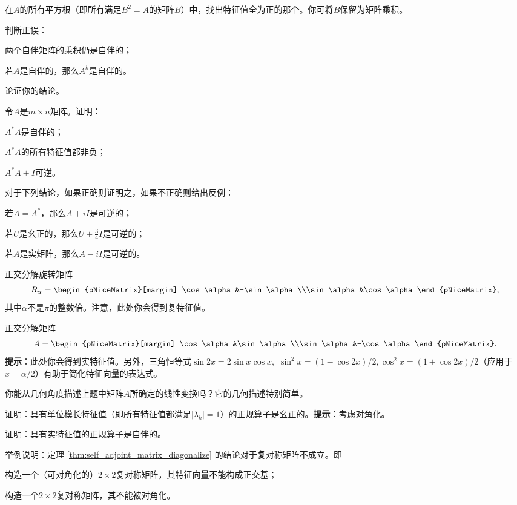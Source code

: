\begin{problemset}
    在$A$的所有平方根（即所有满足$B^2=A$的矩阵$B$）中，找出特征值全为正的那个。你可将$B$保留为矩阵乘积。
    \item 判断正误：
    \begin{probenumerate}
        \item 两个自伴矩阵的乘积仍是自伴的；
        \item 若$A$是自伴的，那么$A^k$是自伴的。
    \end{probenumerate}
    论证你的结论。
    \item 令$A$是$m\times n$矩阵。证明：
    \begin{probenumerate}
        \item $A^*A$是自伴的；
        \item $A^*A$的所有特征值都非负；
        \item $A^*A+I$可逆。
    \end{probenumerate}
    \item 对于下列结论，如果正确则证明之，如果不正确则给出反例：
    \begin{probenumerate}
        \item 若$A=A^*$，那么$A+iI$是可逆的；
        \item 若$U$是幺正的，那么$U+\frac34I$是可逆的；
        \item 若$A$是实矩阵，那么$A-iI$是可逆的。
    \end{probenumerate}
    \item 正交分解旋转矩阵\[R_\alpha=\begin{pNiceMatrix}[margin]
        \cos\alpha&-\sin\alpha\\\sin\alpha&\cos\alpha
    \end{pNiceMatrix},\]其中$\alpha$不是$\pi$的整数倍。注意，此处你会得到复特征值。
    \item 正交分解矩阵\[A=\begin{pNiceMatrix}[margin]
        \cos\alpha&\sin\alpha\\\sin\alpha&-\cos\alpha
    \end{pNiceMatrix}.\]
    {\bf 提示}：此处你会得到实特征值。另外，三角恒等式$\sin2x=2\sin x\cos x,$ $\sin^2x=(1-\cos2x)/2,\cos^2x=(1+\cos2x)/2$（应用于$x=\alpha/2$）有助于简化特征向量的表达式。
    \item 你能从几何角度描述上题中矩阵$A$所确定的线性变换吗？它的几何描述特别简单。
    \item 证明：具有单位模长特征值（即所有特征值都满足$|\lambda_k|=1$）的正规算子是幺正的。{\bf 提示}：考虑对角化。
    \item 证明：具有实特征值的正规算子是自伴的。
    \item 举例说明：定理 \ref{thm:self_adjoint_matrix_diagonalize} 的结论对于{\bf 复}对称矩阵不成立。即
    \begin{probenumerate}
        \item 构造一个（可对角化的）$2\times 2$复对称矩阵，其特征向量不能构成正交基；
        \item 构造一个$2\times 2$复对称矩阵，其不能被对角化。
    \end{probenumerate}
\end{problemset}

